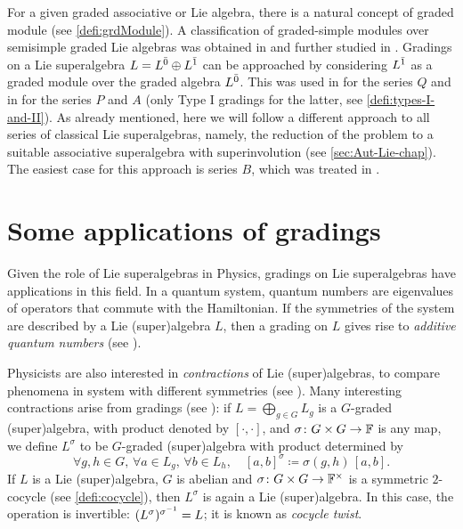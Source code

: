 For a given graded associative or Lie algebra, there is a natural concept of graded module (see \cref{defi:grdModule}). 
A classification of graded-simple modules over semisimple graded Lie algebras was obtained in \cite{EK15,EK_d4,MR3707906} and further studied in \cite{grdd-modules-loop}. 
Gradings on a Lie superalgebra $L = L^{\bar0} \oplus L^{\bar1}$ can be approached by considering $L
^{\bar1}$ as a graded module over the graded algebra $L^{\bar0}$. 
This was used in \cite{paper-Qn} for the series $Q$ and in \cite{paper-MAP} for the series $P$ and $A$ (only Type I gradings for the latter, see \cref{defi:types-I-and-II}). 
As already mentioned, here we will follow a different approach to all series of classical Lie superalgebras, namely, the reduction of the problem to a suitable associative superalgebra with superinvolution (see \cref{sec:Aut-Lie-chap}). 
The easiest case for this  approach is series $B$, which was treated in \cite{Helens_thesis}. 


\section{Some applications of gradings}


Given the role of Lie superalgebras in Physics, gradings on Lie superalgebras have applications in this field. 
In a quantum system, quantum numbers are eigenvalues of operators that commute with the Hamiltonian. 
If the symmetries of the system are described by a Lie (super)algebra $L$, then a grading on $L$ gives rise to \emph{additive quantum numbers} (see \cite{MR974693,MR1025215,MR1940451}). 


Physicists are also interested in \emph{contractions} of Lie (super)algebras, to compare phenomena in system with different symmetries (see \cite{MR55352}). 
Many interesting contractions arise from gradings (see \cite{MR1098200}): if $L = \bigoplus_{g \in G} L_g$ is a $G$-graded (super)algebra, with product denoted by $[\cdot, \cdot]$, and $\sigma\colon G\times G \to \mathbb{F}$ is any map, we define $L^\sigma$ to be $G$-graded (super)algebra with product determined by
\[
    \forall g,h\in G, \,
    \forall a\in L_g, \,
    \forall b\in L_h, \quad
    [a, b]^\sigma 
    \coloneqq \sigma(g, h)\, [a, b].
\]
If $L$ is a Lie (super)algebra, $G$ is abelian and $\sigma\colon G\times G \to \mathbb{F}^\times$ is a symmetric $2$-cocycle (see \cref{defi:cocycle}), then $L^\sigma$ is again a Lie (super)algebra. 
In this case, the operation is invertible: $(L^\sigma)^{\sigma^{-1}} = L$; it is known as \emph{cocycle twist}. 

